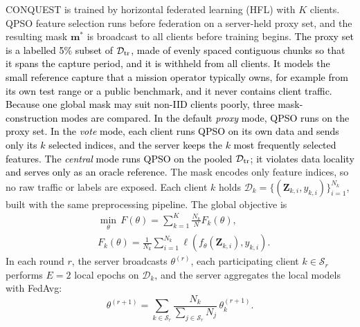 \documentclass[conference]{IEEEtran}
\begin{document}
CONQUEST is trained by horizontal federated learning (HFL) with $K$
clients. QPSO feature selection runs before federation on a
server-held proxy set, and the resulting mask $\mathbf{m}^{*}$ is
broadcast to all clients before training begins.
\textcolor{black}{The proxy set is a labelled 5\% subset of
$\mathcal{D}_{\rm tr}$, made of evenly spaced contiguous chunks so
that it spans the capture period, and it is withheld from all
clients. It models the small reference capture that a mission
operator typically owns, for example from its own test range or a
public benchmark, and it never contains client traffic. Because one
global mask may suit non-IID clients poorly, three mask-construction
modes are compared. In the default \textit{proxy} mode, QPSO runs on
the proxy set. In the \textit{vote} mode, each client runs QPSO on its
own data and sends only its $k$ selected indices, and the server
keeps the $k$ most frequently selected features. The
\textit{central} mode runs QPSO on the pooled $\mathcal{D}_{\rm tr}$;
it violates data locality and serves only as an oracle reference.}
The mask encodes only feature indices, so no raw traffic or labels
are exposed. Each client $k$ holds
$\mathcal{D}_k=\{(\mathbf{Z}_{k,i},y_{k,i})\}_{i=1}^{N_k}$, built with
the same preprocessing pipeline. The global objective is
\begin{equation}
\begin{aligned}
&\min_{\theta}\,F(\theta)=\sum_{k=1}^{K}\frac{N_k}{N}F_k(\theta),\\
&F_k(\theta)=\frac{1}{N_k}\sum_{i=1}^{N_k}
\ell\!\left(f_\theta(\mathbf{Z}_{k,i}),y_{k,i}\right).
\end{aligned}
\label{eq:hfl_objective}
\end{equation}
In each round $r$, the server broadcasts $\theta^{(r)}$, each
participating client $k\in\mathcal{S}_r$ performs $E=2$ local epochs
on $\mathcal{D}_k$, and the server aggregates the local models with
FedAvg:
\begin{equation}
\theta^{(r+1)}=\sum_{k\in\mathcal{S}_r}
\frac{N_k}{\sum_{j\in\mathcal{S}_r}N_j}
\,\theta_k^{(r+1)}.
\label{eq:fedavg}
\end{equation}
\end{document}
